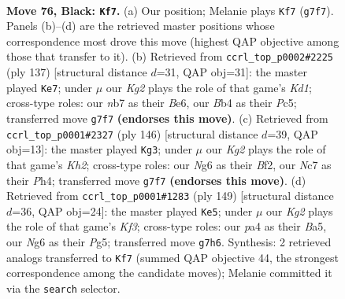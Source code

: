 \documentclass[11pt]{article}
\begin{document}
\clearpage

\begin{figure}[p]\centering
\begin{subfigure}{0.46\textwidth}\centering
\resizebox{\linewidth}{!}{%
\newchessgame
\chessboard[
  setfen={8/1Nn3k1/6n1/p7/Pb1pP3/1P1B3p/1K2P3/8 b - - 19 76},
  showmover=false,
  pgfstyle=straightmove, color=movearrow, markmove={g7-f7}
]}
\caption{}
\end{subfigure}\hfill
\begin{subfigure}{0.46\textwidth}\centering
\resizebox{\linewidth}{!}{%
\newchessgame
\chessboard[
  setfen={3k4/3n1pp1/3Nb2p/1Pp5/6PP/5P2/4BK2/8 b - - 2 69},
  showmover=false,
  pgfstyle=straightmove, color=movearrow, markmove={d8-e7}
]}
\caption{}
\end{subfigure}
\\[4pt]
\begin{subfigure}{0.46\textwidth}\centering
\resizebox{\linewidth}{!}{%
\newchessgame
\chessboard[
  setfen={B7/3kn2p/6p1/P5P1/7P/5p2/4bB1K/8 w - - 13 74},
  showmover=false,
  pgfstyle=straightmove, color=movearrow, markmove={h2-g3}
]}
\caption{}
\end{subfigure}\hfill
\begin{subfigure}{0.46\textwidth}\centering
\resizebox{\linewidth}{!}{%
\newchessgame
\chessboard[
  setfen={8/8/5k2/b1n3pp/2B5/1P2PK1P/8/5N2 b - - 3 75},
  showmover=false,
  pgfstyle=straightmove, color=movearrow, markmove={f6-e5}
]}
\caption{}
\end{subfigure}
\caption{\textbf{Move 76, Black: \texttt{Kf7}.} (a) Our position; Melanie plays \texttt{Kf7} (\texttt{g7f7}). Panels (b)--(d) are the retrieved master positions whose correspondence most drove this move (highest QAP objective among those that transfer to it). (b) Retrieved from \texttt{ccrl\_top\_p0002\#2225} (ply 137) [structural distance $d$=31, QAP obj=31]: the master played \texttt{Ke7}; under $\mu$ our \emph{Kg2} plays the role of that game's \emph{Kd1}; cross-type roles: our \emph{n}b7 as their \emph{B}e6, our \emph{B}b4 as their \emph{P}c5; transferred move \texttt{g7f7} \textbf{(endorses this move)}. (c) Retrieved from \texttt{ccrl\_top\_p0001\#2327} (ply 146) [structural distance $d$=39, QAP obj=13]: the master played \texttt{Kg3}; under $\mu$ our \emph{Kg2} plays the role of that game's \emph{Kh2}; cross-type roles: our \emph{N}g6 as their \emph{B}f2, our \emph{N}c7 as their \emph{P}h4; transferred move \texttt{g7f7} \textbf{(endorses this move)}. (d) Retrieved from \texttt{ccrl\_top\_p0001\#1283} (ply 149) [structural distance $d$=36, QAP obj=24]: the master played \texttt{Ke5}; under $\mu$ our \emph{Kg2} plays the role of that game's \emph{Kf3}; cross-type roles: our \emph{p}a4 as their \emph{B}a5, our \emph{N}g6 as their \emph{P}g5; transferred move \texttt{g7h6}. Synthesis: 2 retrieved analogs transferred to \texttt{Kf7} (summed QAP objective 44, the strongest correspondence among the candidate moves); Melanie committed it via the \texttt{search} selector.}
\label{fig:thought-m151}
\end{figure}
\end{document}
